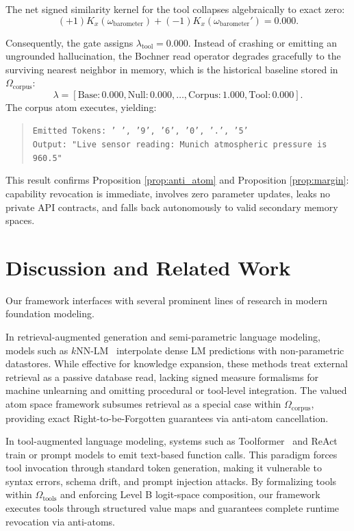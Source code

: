 \documentclass[preprint,12pt]{elsarticle}
\begin{document}
The net signed similarity kernel for the tool collapses algebraically to exact zero:
\begin{equation}
(+1) K_x(\omega_{\mathrm{barometer}}) + (-1) K_x(\omega_{\mathrm{barometer}}') = 0.000.
\end{equation}

Consequently, the gate assigns $\lambda_{\mathrm{tool}} = 0.000$. Instead of crashing or emitting an ungrounded hallucination, the Bochner read operator degrades gracefully to the surviving nearest neighbor in memory, which is the historical baseline stored in $\Omega_{\mathrm{corpus}}$:
\begin{equation}
\lambda = [\text{Base}: 0.000, \text{Null}: 0.000, \dots, \text{Corpus}: 1.000, \text{Tool}: 0.000].
\end{equation}
The corpus atom executes, yielding:
\begin{quote}
\texttt{Emitted Tokens: ' ', '9', '6', '0', '.', '5'} \\
\texttt{Output: "Live sensor reading: Munich atmospheric pressure is 960.5"}
\end{quote}

This result confirms Proposition \ref{prop:anti_atom} and Proposition \ref{prop:margin}: capability revocation is immediate, involves zero parameter updates, leaks no private API contracts, and falls back autonomously to valid secondary memory spaces.

\section{Discussion and Related Work}

Our framework interfaces with several prominent lines of research in modern foundation modeling.

In retrieval-augmented generation and semi-parametric language modeling, models such as $k\text{NN-LM}$~\cite{khandelwal2020generalization} interpolate dense LM predictions with non-parametric datastores. While effective for knowledge expansion, these methods treat external retrieval as a passive database read, lacking signed measure formalisms for machine unlearning and omitting procedural or tool-level integration. The valued atom space framework subsumes retrieval as a special case within $\Omega_{\mathrm{corpus}}$, providing exact Right-to-be-Forgotten guarantees via anti-atom cancellation.

In tool-augmented language modeling, systems such as Toolformer~\cite{schick2023toolformer} and ReAct~\cite{yao2023react} train or prompt models to emit text-based function calls. This paradigm forces tool invocation through standard token generation, making it vulnerable to syntax errors, schema drift, and prompt injection attacks. By formalizing tools within $\Omega_{\mathrm{tools}}$ and enforcing Level B logit-space composition, our framework executes tools through structured value maps and guarantees complete runtime revocation via anti-atoms.
\end{document}
